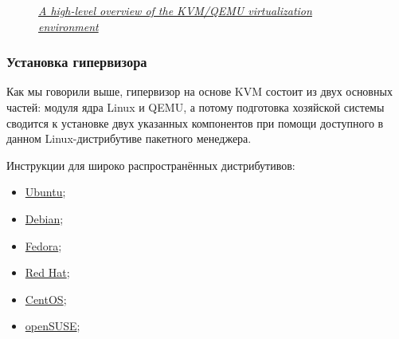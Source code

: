 \documentclass[14pt, a4paper]{article}
\begin{document}
\begin{figure}[h]%
    \centering
    \caption*{\textit{\href{https://commons.wikimedia.org/wiki/File:Kernel-based_Virtual_Machine.svg}{A high-level overview of the KVM/QEMU virtualization environment}}}
    \label{3.1}
\end{figure}

\subsubsection*{Установка гипервизора}

Как мы говорили выше, гипервизор на основе KVM состоит из двух основных частей: модуля ядра
Linux и QEMU, а потому подготовка хозяйской системы сводится к установке двух указанных
компонентов при помощи доступного в данном Linux-дистрибутиве пакетного менеджера.

Инструкции для широко распространённых дистрибутивов:
\begin{itemize}
    \item \href{https://help.ubuntu.ru/wiki/kvm}{Ubuntu};
    \item \href{https://wiki.debian.org/ru/KVM}{Debian};
    \item \href{https://docs.fedoraproject.org/en-US/quick-docs/getting-started-with-virtualization/}{Fedora};
    \item \href{https://access.redhat.com/documentation/en-us/red_hat_enterprise_linux/7/html/virtualization_deployment_and_administration_guide/index/}{Red Hat};
    \item \href{https://wiki.centos.org/HowTos/KVM}{CentOS};
    \item \href{https://doc.opensuse.org/documentation/leap/virtualization/single-html/book.virt/index.html#sec-vt-installation-kvm}{openSUSE};
\end{itemize}
\end{document}
